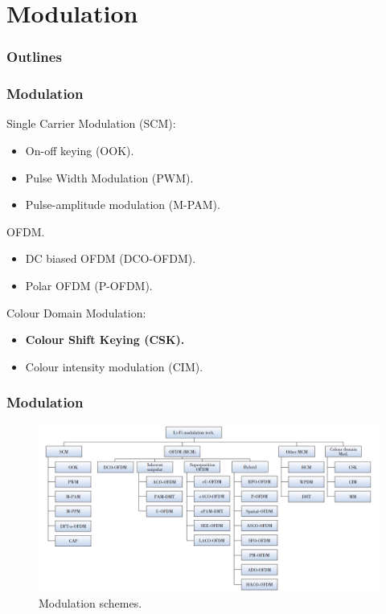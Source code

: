 \documentclass[mathserif]{beamer}
\newcommand{\wait}{\vfill}
\begin{document}
\section{Modulation}
\begin{frame}
\frametitle{Outlines}
	\small
	\tableofcontents[currentsection]
\end{frame}

\begin{frame}
\frametitle{Modulation}
Single Carrier Modulation (SCM):
\begin{itemize}
	\item On-off keying (OOK).
	\item Pulse Width Modulation (PWM).
	\item Pulse-amplitude modulation (M-PAM). \wait
\end{itemize}

OFDM.
\begin{itemize}
	\item DC biased OFDM (DCO-OFDM).
	\item Polar OFDM (P-OFDM). \wait
\end{itemize}

Colour Domain Modulation:
\begin{itemize}
	\item \textbf{Colour Shift Keying (CSK).}
	\item Colour intensity modulation (CIM). \wait
\end{itemize}	
\end{frame}	

\begin{frame}
\frametitle{Modulation}
\begin{figure}
\centering
\includegraphics[width=\linewidth]{figuras/modulation}
\caption{Modulation schemes.}
\label{fig:modulation}
\end{figure}
\end{frame}	
\end{document}
